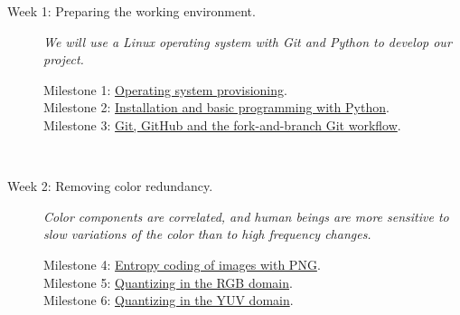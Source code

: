 \begin{description}
\item [Week 1: {\normalfont Preparing the working
    environment.}] \emph{We will use a Linux operating system with
  Git and Python to develop our project.}
  \begin{description}
  \item [Milestone 1: {\normalfont \href{https://sistemas-multimedia.github.io/milestones/01-provisioning/}{Operating system provisioning}.}]
  \item [Milestone 2: {\normalfont \href{https://sistemas-multimedia.github.io/milestones/02-python/}{Installation and basic programming with Python}.}]
  \item [Milestone 3: {\normalfont \href{https://sistemas-multimedia.github.io/milestones/03-git/}{Git, GitHub and the fork-and-branch Git workflow}.}]
  \end{description}
  ~\newline

\item [Week 2: {\normalfont Removing color redundancy.}] \emph{Color
    components are correlated, and human beings are more sensitive to
    slow variations of the color than to high frequency changes.}
  \begin{description}
  \item [Milestone 4: {\normalfont \href{https://sistemas-multimedia.github.io/milestones/04-Motion_PNG/}{Entropy coding of images with PNG}.}]
  \item [Milestone 5: {\normalfont \href{https://sistemas-multimedia.github.io/milestones/05-RGB_quantization/}{Quantizing in the RGB domain}.}]
  \item [Milestone 6: {\normalfont \href{https://sistemas-multimedia.github.io/milestones/06-YUV_quantization/}{Quantizing in the YUV domain}.}] %
  \end{description}
  ~\newline


\end{description}
